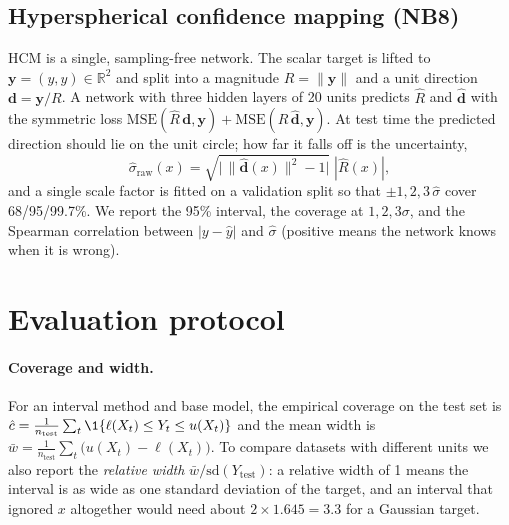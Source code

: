 \documentclass[11pt]{article}
\begin{document}
\subsection{Hyperspherical confidence mapping (NB8)}
HCM \cite{choi2026hcm} is a single, sampling-free network. The scalar target is lifted to $\mathbf y=(y,y)\in\mathbb R^2$ and
split into a magnitude $R=\|\mathbf y\|$ and a unit direction $\mathbf d=\mathbf y/R$. A network with three hidden layers of 20
units predicts $\hat R$ and $\hat{\mathbf d}$ with the symmetric loss
$\mathrm{MSE}(\hat R\,\mathbf d,\mathbf y)+\mathrm{MSE}(R\,\hat{\mathbf d},\mathbf y)$. At test time the predicted direction should lie on the
unit circle; how far it falls off is the uncertainty,
\begin{equation}
\hat\sigma_{\text{raw}}(x)=\sqrt{\big|\,\|\hat{\mathbf d}(x)\|^2-1\big|}\;|\hat R(x)|,
\end{equation}
and a single scale factor is fitted on a validation split so that $\pm1,2,3\,\hat\sigma$ cover 68/95/99.7\%. We report the 95\%
interval, the coverage at $1,2,3\sigma$, and the Spearman correlation between $|y-\hat y|$ and $\hat\sigma$ (positive means the
network knows when it is wrong).

\section{Evaluation protocol}\label{sec:eval}
\paragraph{Coverage and width.} For an interval method and base model, the empirical coverage on the test set is
$\hat c=\frac1{n_{\text{test}}}\sum_{t}\1\{\ell(X_t)\le Y_t\le u(X_t)\}$ and the mean width is
$\bar w=\frac1{n_{\text{test}}}\sum_t\big(u(X_t)-\ell(X_t)\big)$. To compare datasets with different units we also report the
\emph{relative width} $\bar w/\mathrm{sd}(Y_{\text{test}})$: a relative width of 1 means the interval is as wide as one standard
deviation of the target, and an interval that ignored $x$ altogether would need about $2\times1.645=3.3$ for a Gaussian target.
\end{document}

